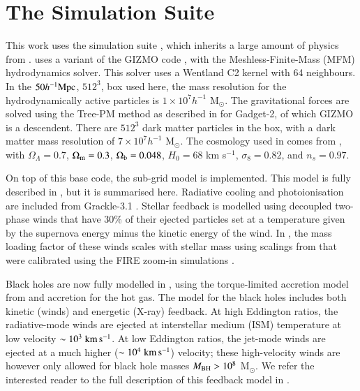 \section{The \simba{} Simulation Suite}
\label{sec:simba}

This work uses the \simba{} simulation suite \citep{Dave2019}, which inherits a
large amount of physics from \mufasa{} \citep{Dave2016}. \simba{} uses a
variant of the GIZMO code \citep{Hopkins2015}, with the Meshless-Finite-Mass
(MFM) hydrodynamics solver. This solver uses a Wentland C2 kernel with 64
neighbours. In the $50 h^{-1}{\rm Mpc}{}$, $512^3$, box used here, the mass resolution for the
hydrodynamically active particles is $1\times10^7h^{-1}$ M$_\odot$. The
gravitational forces are solved using the Tree-PM method as described in
\citet{Springel2005b} for Gadget-2, of which GIZMO is a descendent. There are
$512^3$ dark matter particles in the box, with a dark matter mass resolution of
$7\times10^7h^{-1}$ M$_\odot$. The cosmology used in \simba{} comes from
\citet{PlanckCollaboration2016}, with $\Omega_\Lambda = 0.7$, $\Omega_{\rm m} =
0.3$, $\Omega_{\rm b} = 0.048$, $H_0 = 68$ km s$^{-1}$, $\sigma_8=0.82$, and
$n_s=0.97$.

On top of this base code, the \simba{} sub-grid model is implemented. This
model is fully described in \citet{Dave2019}, but it is summarised here.
Radiative cooling and photoionisation are included from Grackle-3.1
\citep{Smith2016}. Stellar feedback is modelled using decoupled two-phase winds
that have 30\% of their ejected particles set at a temperature given by the
supernova energy minus the kinetic energy of the wind. In \simba{}, the mass
loading factor of these winds scales with stellar mass using scalings from
\citet{Muratov2015} that were calibrated using the FIRE zoom-in simulations
\citep{Hopkins2014}.

Black holes are now fully modelled in \simba{}, using the torque-limited
accretion model from \citet{AnglesAlcazar2017b} and \citet{Bondi1952}
accretion for the hot gas. The model for the black holes includes both kinetic
(winds) and energetic (X-ray) feedback. At high Eddington ratios, the
radiative-mode winds are ejected at interstellar medium (ISM) temperature at
low velocity $\sim 10^3 \;{\rm km}\,{\rm s}^{-1}{}$. At low Eddington ratios, the jet-mode winds
are ejected at a much higher ($\sim 10^4\;{\rm km}\,{\rm s}^{-1}{}$) velocity; these high-velocity
winds are however only allowed for black hole masses $M_{\rm BH} > 10^8$
M$_\odot$. We refer the interested reader to the full description of this
feedback model in \citet{Dave2019}.

